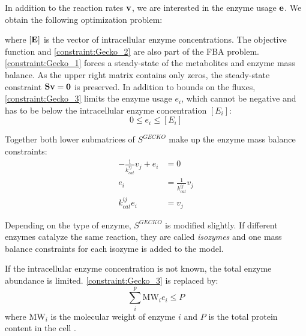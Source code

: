 In addition to the reaction rates $\bold v$, we are interested in the enzyme usage $\bold e$. We obtain the following optimization problem:
\quad where $[\bold E]$ is the vector of intracellular enzyme concentrations.
The objective function and \cref{constraint:Gecko_2} are also part of the \textsf{FBA} problem.
\cref{constraint:Gecko_1} forces a steady-state of the metabolites and enzyme mass balance. As the upper right matrix contains only zeros, the steady-state constraint $\bold S \bold v= \bold 0$ is preserved.
In addition to bounds on the fluxes, \cref{constraint:Gecko_3} limits the enzyme usage $e_i$, which cannot be negative and has to be below the intracellular enzyme concentration $[E_i]$: 
\begin{equation*}
    0 \leq e_i \leq [E_i]    
\end{equation*}

Together both lower submatrices of $S^{GECKO}$ make up the enzyme mass balance constraints: 
\begin{align*}
    -\frac{1}{k_{cat}^{ij}}v_j + e_i &= 0 \\
    e_i &= \frac{1}{k_{cat}^{ij}} v_j \\
    k_{cat}^{ij} e_i &= v_j
\end{align*}

Depending on the type of enzyme, $S^{GECKO}$ is modified slightly. If different enzymes catalyze the same reaction, they are called \textit{isozymes} and one mass balance constraints for each isozyme is added to the model.

If the intracellular enzyme concentration is not known, the total enzyme abundance is limited.   
\cref{constraint:Gecko_3} is replaced by:
\begin{equation*}
    \sum_i^p \text{MW}_i e_i \leq P
\end{equation*}
\quad where $\text{MW}_i$ is the molecular weight of enzyme $i$ and $P$ is the total protein content in the cell \cite{improving_phenotype_predictions}.